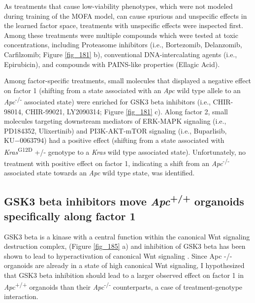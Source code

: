 \begin{flushleft}
As treatments that cause low-viability phenotypes, which were not modeled during training of the MOFA model, can cause spurious and unspecific effects in the learned factor space, treatments with unspecific effects were inspected first. Among these treatments were multiple compounds which were tested at toxic concentrations, including Proteasome inhibitors (i.e., Bortezomib, Delanzomib, Carfilzomib; Figure \ref{fig_181} b), conventional DNA-intercalating agents (i.e., Epirubicin), and compounds with PAINS-like properties (Ellagic Acid). 
\par

Among factor-specific treatments, small molecules that displayed a negative effect on factor 1 (shifting from a state associated with an \textit{Apc} wild type allele to an \textit{Apc}\textsuperscript{-/-}  associated state) were enriched for GSK3 beta inhibitors (i.e., CHIR-98014, CHIR-99021, LY2090314; Figure \ref{fig_181} c). Along factor 2, small molecules targeting downstream mediators of ERK-MAPK signaling (i.e.,  PD184352, Ulixertinib) and PI3K-AKT-mTOR signaling (i.e., Buparlisib, KU−0063794) had a positive effect (shifting from a state associated with \textit{Kras}\textsuperscript{G12D} +/- genotype to a \textit{Kras} wild type associated state). Unfortunately, no treatment with positive effect on factor 1, indicating a shift from an \textit{Apc}\textsuperscript{-/-}  associated state towards an \textit{Apc} wild type state, was identified. 

\clearpage
\subsection{GSK3 beta inhibitors move \textit{Apc}\textsuperscript{+/+} organoids specifically along factor 1}

GSK3 beta is a kinase with a central function within the canonical Wnt signaling destruction complex, \parencite{stamosVCateninDestructionComplex2013} (Figure \ref{fig_185} a) and inhibition of GSK3 beta has been shown to lead to hyperactivation of canonical Wnt signaling \parencite{stambolicLithiumInhibitsGlycogen1996}. Since Apc -/- organoids are already in a state of high canonical Wnt signaling, I hypothesized that GSK3 beta inhibition should lead to a larger observed effect on factor 1 in \textit{Apc}\textsuperscript{+/+} organoids than their \textit{Apc}\textsuperscript{-/-}  counterparts, a case of treatment-genotype interaction. 


\end{flushleft}

